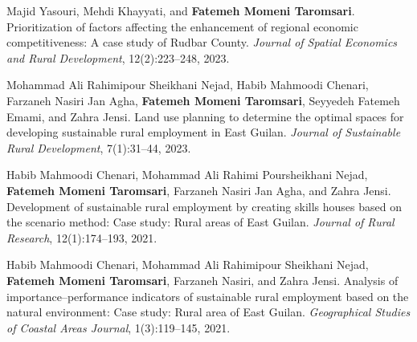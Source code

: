 
\vspace{1.0em}

{\fontsize{9pt}{1em}\bodyfontlight\upshape\color{text}
\begin{cvitems}

\item {Majid Yasouri, Mehdi Khayyati, and \textbf{Fatemeh Momeni Taromsari}. Prioritization of factors affecting the enhancement of regional economic competitiveness: A case study of Rudbar County. \textit{Journal of Spatial Economics and Rural Development}, 12(2):223--248, 2023.}

\item {Mohammad Ali Rahimipour Sheikhani Nejad, Habib Mahmoodi Chenari, Farzaneh Nasiri Jan Agha, \textbf{Fatemeh Momeni Taromsari}, Seyyedeh Fatemeh Emami, and Zahra Jensi. Land use planning to determine the optimal spaces for developing sustainable rural employment in East Guilan. \textit{Journal of Sustainable Rural Development}, 7(1):31--44, 2023.}

\item {Habib Mahmoodi Chenari, Mohammad Ali Rahimi Poursheikhani Nejad, \textbf{Fatemeh Momeni Taromsari}, Farzaneh Nasiri Jan Agha, and Zahra Jensi. Development of sustainable rural employment by creating skills houses based on the scenario method: Case study: Rural areas of East Guilan. \textit{Journal of Rural Research}, 12(1):174--193, 2021.}

\item {Habib Mahmoodi Chenari, Mohammad Ali Rahimipour Sheikhani Nejad, \textbf{Fatemeh Momeni Taromsari}, Farzaneh Nasiri, and Zahra Jensi. Analysis of importance--performance indicators of sustainable rural employment based on the natural environment: Case study: Rural area of East Guilan. \textit{Geographical Studies of Coastal Areas Journal}, 1(3):119--145, 2021.}

\end{cvitems}
}

\vspace{1.0em}